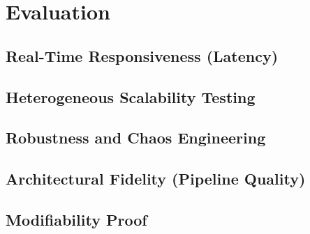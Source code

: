 \chapter{Evaluation}
\label{chap:evaluation}

\section{Real-Time Responsiveness (Latency)}
\label{sec:eval_latency}


\section{Heterogeneous Scalability Testing}
\label{sec:eval_scalability}


\section{Robustness and Chaos Engineering}
\label{sec:eval_robustness}

\section{Architectural Fidelity (Pipeline Quality)}
\label{sec:eval_fidelity}


\section{Modifiability Proof}
\label{sec:eval_modifiability}
